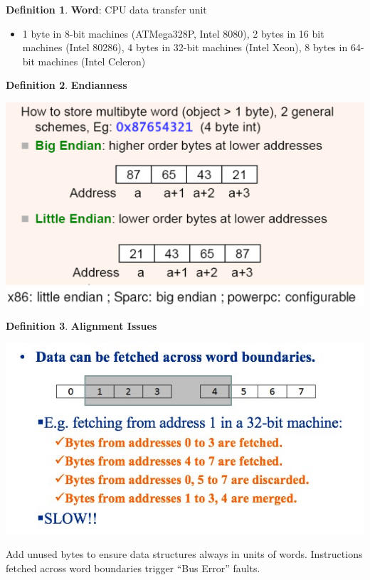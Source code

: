 \documentclass[11pt,a4paper]{article}
\theoremstyle{definition}
\newtheorem{definition}{Definition}[section]
\newenvironment{myitemize}
{ \begin{itemize}
    \setlength{\itemsep}{5pt}
    \setlength{\parskip}{0pt}
    \setlength{\parsep}{0pt}     }
{ \end{itemize}                  }
\begin{document}
\begin{definition}{\textbf{Word}}: CPU data transfer unit
	\begin{myitemize}
		\item 1 byte in 8-bit machines (ATMega328P, Intel 8080), 2 bytes in 16 bit machines (Intel 80286),  4 bytes in 32-bit machines (Intel Xeon), 8 bytes in 64-bit machines (Intel Celeron)
	\end{myitemize}
\end{definition}

\begin{minipage}{0.6\linewidth}
	\begin{definition}{\textbf{Endianness}}
	\begin{center}
		\includegraphics[width=1\linewidth]{m4/endianness}
	\end{center}
\end{definition}
\end{minipage}
\begin{minipage}{0.40\linewidth}
	\begin{definition}{\textbf{Alignment Issues}}
	\begin{center}
		\includegraphics[width=1\linewidth]{m4/alignmentIssues}
	\end{center}
	
	Add unused bytes to ensure data structures always in units of words. Instructions fetched across word boundaries trigger ``Bus Error'' faults.
\end{definition}
\end{minipage}
\end{document}
